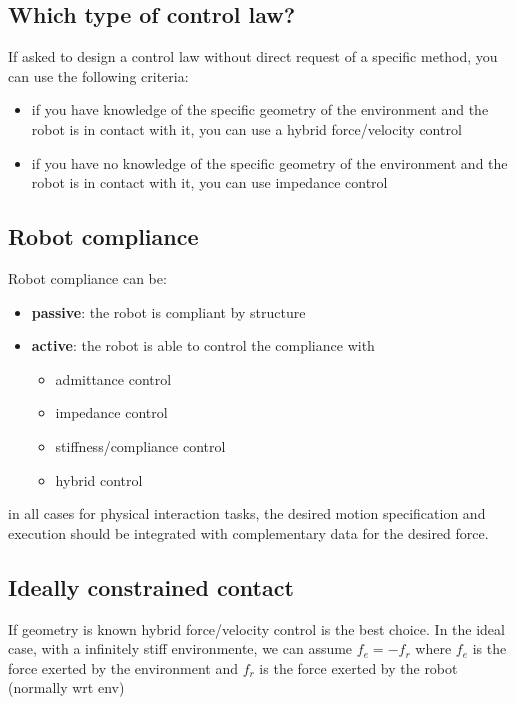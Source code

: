 \documentclass[a4paper,12pt]{article}
\begin{document}
\subsection{Which type of control law?}
If asked to design a control law without direct request of a
 specific method, you can use the following criteria:
\begin{itemize}
    \item if you have knowledge of the specific geometry of the
    environment and the robot is in contact with it, you can use
    a hybrid force/velocity control
    \item if you have no knowledge of the specific geometry of the
    environment and the robot is in contact with it, you can use
    impedance control
\end{itemize}
\subsection{Robot compliance}
Robot compliance can be:
\begin{itemize}
    \item \textbf{passive}: the robot is compliant by structure
    \item \textbf{active}: the robot is able to control the compliance
    with \begin{itemize}
    \item admittance control
    \item impedance control
    \item stiffness/compliance control
    \item hybrid control
    \end{itemize}
\end{itemize}
in all cases for physical interaction tasks, the desired motion
specification and execution should be integrated with
complementary data for the desired force.
\subsection{Ideally constrained contact}
If geometry is known hybrid force/velocity control is the best choice.
In the ideal case, with a infinitely stiff environmente,
we can assume $f_e = - f_r$ where $f_e$ is the force exerted by the
environment and $f_r$ is the force exerted by the robot (normally wrt env)
\end{document}
